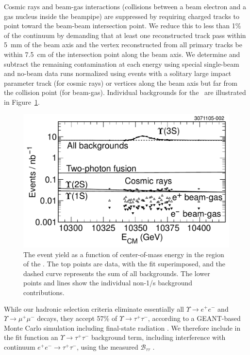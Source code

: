 \documentclass[aps,prl,twocolumn,superscriptaddress,showpacs,floatfix]{revtex4}
\begin{document}
Cosmic rays and beam-gas interactions (collisions between a beam
electron and a gas nucleus inside the beampipe) are suppressed by
requiring charged tracks to point toward the beam-beam intersection
point.  We reduce this to less than 1\% of the continuum by demanding
that at least one reconstructed track pass within 5~mm of the beam
axis and the vertex reconstructed from all primary tracks be within
7.5~cm of the intersection point along the beam axis.  We determine
and subtract the remaining contamination at each energy using special
single-beam and no-beam data runs normalized using events with a
solitary large impact parameter track (for cosmic rays) or vertices
along the beam axis but far from the collision point (for beam-gas).
Individual backgrounds for the \usss\ are illustrated in Figure~\ref{fig:backgrounds}.

\begin{figure}
  \includegraphics[width=\linewidth]{backgrounds}
  \caption{\label{fig:backgrounds} The event yield as a function of
center-of-mass energy in the region of the \usss.  The top points are
data, with the fit superimposed, and the dashed curve represents the
sum of all backgrounds.  The lower points and lines show the
individual non-1/s background contributions.}
\end{figure}

While our hadronic selection criteria eliminate essentially all
$\Upsilon \to e^+e^-$ and $\Upsilon \to \mu^+\mu^-$ decays, they
accept 57\% of $\Upsilon \to \tau^+\tau^-$, according to a GEANT-based
Monte Carlo simulation \cite{mc} including final-state radiation
\cite{photos}.  We therefore include in the fit function an $\Upsilon
\to \tau^+\tau^-$ background term, including interference with
continuum $e^+e^- \to \tau^+\tau^-$, using the measured ${\mathcal
B}_{\tau\tau}$ \cite{jean}.
\end{document}

